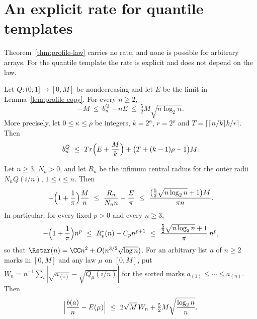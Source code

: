 
\section{An explicit rate for quantile templates}\label{sec:rate}

Theorem~\ref{thm:profile-law} carries no rate, and none is possible for
arbitrary arrays. For the quantile template the rate is explicit and does
not depend on the law.

\begin{theorem}\label{thm:rate}
Let $Q:(0,1]\to[0,M]$ be nondecreasing and let $E$ be the limit in
Lemma~\ref{lem:profile-copy}. For every $n\ge2$,
\begin{equation}\label{eq:rate}
 -M\ \le\ b_n^Q-nE\ \le\ \tfrac52M\sqrt{n\log_2 n}.
\end{equation}
More precisely, let $0\le\kappa\le\rho$ be integers, $k=2^\kappa$,
$r=2^\rho$ and $T=\lceil\lceil n/k\rceil k/r\rceil$. Then
\begin{equation}\label{eq:rate-two}
 b_n^Q\ \le\ Tr\Bigl(E+\frac Mk\Bigr)+\bigl(T+(k-1)\rho-1\bigr)M .
\end{equation}
\end{theorem}

\begin{corollary}\label{cor:rate-ring}
Let $n\ge3$, $N_n>0$, and let $R_n$ be the infimum central radius for the
outer radii $N_nQ(i/n)$, $1\le i\le n$. Then
\begin{equation}\label{eq:rate-ring}
 -\Bigl(1+\frac1\pi\Bigr)\frac Mn\ \le\ \frac{R_n}{N_n n}-\frac E\pi
 \ \le\ \frac{\bigl(\frac52\sqrt{n\log_2 n}+1\bigr)M}{\pi n}.
\end{equation}
In particular, for every fixed $p>0$ and every $n\ge3$,
\[
 -\Bigl(1+\frac1\pi\Bigr)n^{p}\ \le\ R_p^*(n)-C_pn^{p+1}
 \ \le\ \frac{\frac52\sqrt{n\log_2 n}+1}{\pi}\,n^{p},
\]
so that $\Rstar(n)=\CC n^2+O(n^{3/2}\sqrt{\log n})$.
For an arbitrary list $a$ of $n\ge2$ marks in $[0,M]$ and any law $\mu$
on $[0,M]$, put
$W_n=n^{-1}\sum_i|\sqrt{a_{(i)}}-\sqrt{Q_\mu(i/n)}|$ for the sorted marks
$a_{(1)}\le\cdots\le a_{(n)}$. Then
\[
 \Bigl|\frac{b(a)}{n}-E(\mu)\Bigr|\ \le\ 2\sqrt M\,W_n
 +\tfrac52M\sqrt{\frac{\log_2 n}{n}} .
\]
\end{corollary}


